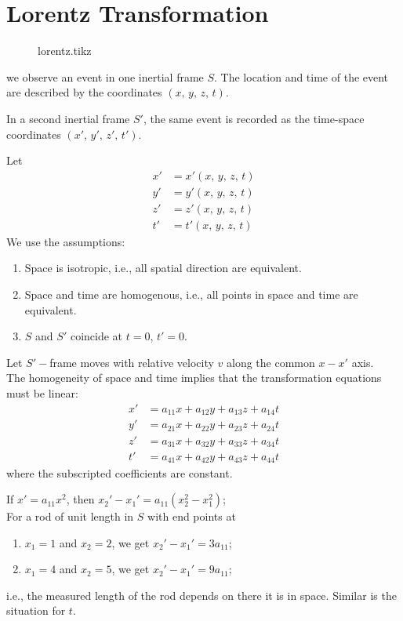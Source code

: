 \documentclass[../main-sheet.tex]{subfiles}
\begin{document}
\section{Lorentz Transformation}
\begin{figure}[H]
    \centering
    {lorentz.tikz}
\end{figure}
we observe an event in one inertial frame \(S \). The location and time of the event are described by the coordinates \((x,\,y,\,z,\,t )\).

In a second inertial frame \(S'\), the same event is recorded as the time-space coordinates \((x',\,y',\,z',\,t' )\).

Let 
\begin{align*}
    x'&=x'(x,\,y,\,z,\,t)\\
    y'&=y'(x,\,y,\,z,\,t)\\
    z'&=z'(x,\,y,\,z,\,t)\\
    t'&=t'(x,\,y,\,z,\,t)
\end{align*}
We use the assumptions:
\begin{enumerate}[label=(\roman*)]
    \item Space is isotropic, i.e., all spatial direction are equivalent.
    \item Space and time are homogenous, i.e., all points in space and time are equivalent.
    \item \(S \) and \(S' \) coincide at \(t=0\), \(t'=0\).
\end{enumerate}
Let \(S'-\)frame moves with relative velocity \(v \) along the common \(x-x'\) axis.\\
The homogeneity of space and time implies that the transformation equations must be linear:
\begin{align*}
    x'&=a_{11 } x+a_{12 }y+a_{13 }z+a_{14 }t\\
    y'&=a_{21 } x+a_{22 }y+a_{23 }z+a_{24 }t\\
    z '&=a_{31 } x+a_{32 }y+a_{33 }z+a_{34 }t\\
    t '&=a_{41 } x+a_{42 }y+a_{43 }z+a_{44 }t
\end{align*}
where the subscripted coefficients are constant.
\begin{note}
    If \(x'=a_{11}x^2\), then \(x_2'-x_1'=a_{11}(x_2^2-x_1^2 )\);\\
    For a rod of unit length in \(S \) with end points at
    \begin{enumerate}[label=(\roman*)]
        \item \(x_1=1\) and \(x_2=2\), we get \(x_2'-x_1'=3a_{11}\);
        \item \(x_1=4\) and \(x_2=5\), we get \(x_2'-x_1'=9a_{11}\);
    \end{enumerate}
    i.e., the measured length of the rod depends on there it is in space. Similar is the situation for \(t \).
\end{note}
\end{document}
